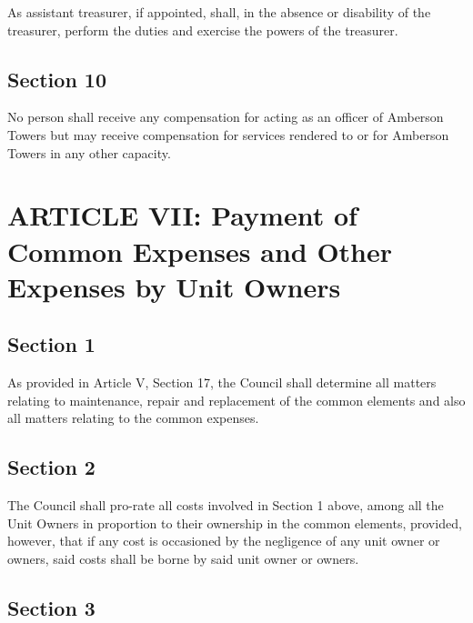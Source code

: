 \documentclass[
]{book}
\begin{document}
As assistant treasurer, if appointed, shall, in the absence or disability of the treasurer, perform the duties and exercise the powers of the treasurer.

\hypertarget{section-10-2}{%
\subsection*{Section 10}\label{section-10-2}}

No person shall receive any compensation for acting as an officer of Amberson Towers but may receive compensation for services rendered to or for Amberson Towers in any other capacity.

\hypertarget{article-vii-payment-of-common-expenses-and-other-expenses-by-unit-owners}{%
\section*{ARTICLE VII: Payment of Common Expenses and Other Expenses by Unit Owners}\label{article-vii-payment-of-common-expenses-and-other-expenses-by-unit-owners}}

\hypertarget{section-1-6}{%
\subsection*{Section 1}\label{section-1-6}}

As provided in Article V, Section 17, the Council shall determine all matters relating to maintenance, repair and replacement of the common elements and also all matters relating to the common expenses.

\hypertarget{section-2-6}{%
\subsection*{Section 2}\label{section-2-6}}

The Council shall pro-rate all costs involved in Section 1 above, among all the Unit Owners in proportion to their ownership in the common elements, provided, however, that if any cost is occasioned by the negligence of any unit owner or owners, said costs shall be borne by said unit owner or owners.

\hypertarget{section-3-3}{%
\subsection*{Section 3}\label{section-3-3}}
\end{document}
